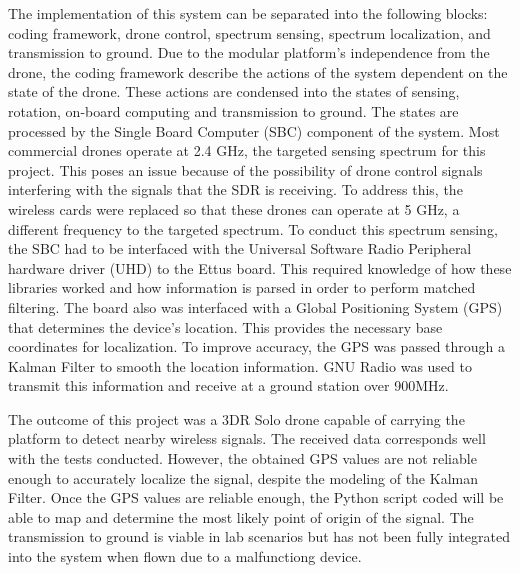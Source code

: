 The implementation of this system can be separated into the following blocks: coding framework, drone control, spectrum sensing, spectrum localization, and transmission to ground. Due to the modular platform's independence from the drone, the coding framework describe the actions of the system dependent on the state of the drone. These actions are condensed into the states of sensing, rotation, on-board computing and transmission to ground. The states are processed by the Single Board Computer (SBC) component of the system. Most commercial drones operate at 2.4 GHz, the targeted sensing spectrum for this project. This poses an issue because of the possibility of drone control signals interfering with the signals that the SDR is receiving. To address this, the wireless cards were replaced so that these drones can operate at 5 GHz, a different frequency to the targeted spectrum. To conduct this spectrum sensing, the SBC had to be interfaced with the Universal Software Radio Peripheral hardware driver (UHD) to the Ettus board. This required knowledge of how these libraries worked and how information is parsed in order to perform matched filtering. The board also was interfaced with a Global Positioning System (GPS) that determines the device's location. This provides the necessary base coordinates for localization. To improve accuracy, the GPS was passed through a Kalman Filter to smooth the location information. GNU Radio was used to transmit this information and receive at a ground station over 900MHz. \par

The outcome of this project was a 3DR Solo drone capable of carrying the platform to detect nearby wireless signals. The received data corresponds well with the tests conducted. However, the obtained GPS values are not reliable enough to accurately localize the signal, despite the modeling of the Kalman Filter. Once the GPS values are reliable enough, the Python script coded will be able to map and determine the most likely point of origin of the signal. The transmission to ground is viable in lab scenarios but has not been fully integrated into the system when flown due to a malfunctiong device. \par